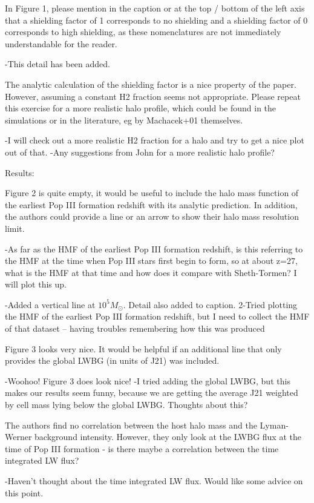 \documentclass[11pt]{article}
\newenvironment{referee}[1][]{%
    \ignorespaces%
    \begin{mdframed}[style=myquotestyle,#1]%
}{%
    \end{mdframed}%
    \ignorespacesafterend%
}%
\begin{document}
\begin{referee}
In Figure 1, please mention in the caption or at the top / bottom of the left axis that a shielding factor of 1 corresponds to no shielding and a shielding factor of 0 corresponds to high shielding, as these nomenclatures are not immediately understandable for the reader.
\end{referee}
-This detail has been added. 

\begin{referee}
The analytic calculation of the shielding factor is a nice property of the paper. However, assuming a constant H2 fraction seems not appropriate. Please repeat this exercise for a more realistic halo profile, which could be found in the simulations or in the literature, eg by Machacek+01 themselves.
\end{referee}
-I will check out a more realistic H2 fraction for a halo and try to get a nice plot out of that.
-Any suggestions from John for a more realistic halo profile?

\begin{referee}
Results:

Figure 2 is quite empty, it would be useful to include the halo mass function of the earliest Pop III formation redshift with its analytic prediction. In addition, the authors could provide a line or an arrow to show their halo mass resolution limit.
\end{referee}
-As far as the HMF of the earliest Pop III formation redshift, is this referring to the HMF at the time when Pop III stars first begin to form, so at about z=27, what is the HMF at that time and how does it compare with Sheth-Tormen? I will plot this up.

-Added a vertical line at $10^5 M_{\odot}$. Detail also added to caption.
2-Tried plotting the HMF of the earliest Pop III formation redshift, but I need to collect the HMF of that dataset -- having troubles remembering how this was produced 


\begin{referee}
Figure 3 looks very nice. It would be helpful if an additional line that only 
provides the global LWBG (in units of J21) was included.
\end{referee}
-Woohoo! Figure 3 does look nice!
-I tried adding the global LWBG, but this makes our results seem funny, because we are getting the average J21 weighted by cell mass lying below the global LWBG. Thoughts about this?

\begin{referee}
The authors find no correlation between the host halo mass and the Lyman-Werner background intensity. However, they only look at the LWBG flux at the time of Pop III formation - is there maybe a correlation between the time integrated LW flux?
\end{referee}
-Haven't thought about the time integrated LW flux. Would like some advice on this point. 
\end{document}
